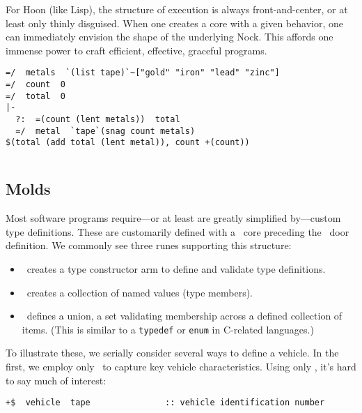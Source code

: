 For Hoon (like Lisp), the structure of execution is always front-and-center, or at least only thinly disguised.  When one creates a core with a given behavior, one can immediately envision the shape of the underlying Nock.  This affords one immense power to craft efficient, effective, graceful programs.

\begin{lstlisting}[language=hoon,
                   caption={Hoon trap to sum the length of several tapes.}]
=/  metals  `(list tape)`~["gold" "iron" "lead" "zinc"]
=/  count  0
=/  total  0
|-
  ?:  =(count (lent metals))  total
  =/  metal  `tape`(snag count metals)
$(total (add total (lent metal)), count +(count))
\end{lstlisting}

\begin{lstlisting}[language=hoon,
                   caption={Nock equivalent}]
\end{lstlisting}

\subsection{Molds}



Most software programs require—or at least are greatly simplified by—custom type definitions.  These are customarily defined with a \barcen~core preceding the \barcab~door definition.  We commonly see three runes supporting this structure:

\begin{itemize}
  \item  \plusbuc~creates a type constructor arm to define and validate type definitions.
  \item  \pbuccen~creates a collection of named values (type members).
  \item  \pbucwut~defines a union, a set validating membership across a defined collection of items.  (This is similar to a \texttt{typedef} or \texttt{enum} in C-related languages.)
\end{itemize}

To illustrate these, we serially consider several ways to define a vehicle.  In the first, we employ only \lusbuc~to capture key vehicle characteristics.  Using only \lusbuc, it's hard to say much of interest:


\begin{lstlisting}[style=nonumbers]
+$  vehicle  tape               :: vehicle identification number
\end{lstlisting}

